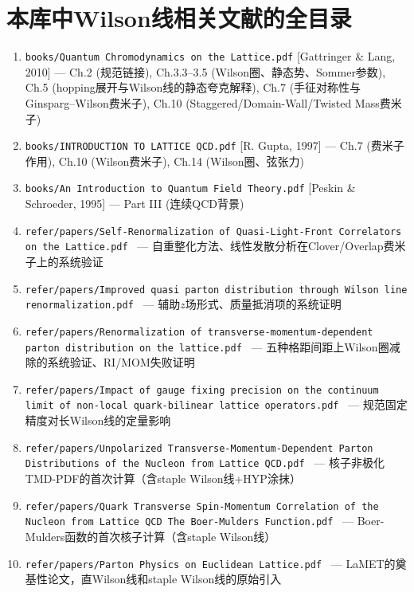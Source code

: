\documentclass[12pt,a4paper]{ctexart}
\theoremstyle{definition}
\begin{document}
\section*{本库中Wilson线相关文献的全目录}

\small
\begin{enumerate}[leftmargin=*,nosep]
    \item \texttt{books/Quantum Chromodynamics on the Lattice.pdf} [Gattringer \& Lang, 2010] — Ch.2 (规范链接), Ch.3.3--3.5 (Wilson圈、静态势、Sommer参数), Ch.5 (hopping展开与Wilson线的静态夸克解释), Ch.7 (手征对称性与Ginsparg--Wilson费米子), Ch.10 (Staggered/Domain-Wall/Twisted Mass费米子)
    \item \texttt{books/INTRODUCTION TO LATTICE QCD.pdf} [R. Gupta, 1997] — Ch.7 (费米子作用), Ch.10 (Wilson费米子), Ch.14 (Wilson圈、弦张力)
    \item \texttt{books/An Introduction to Quantum Field Theory.pdf} [Peskin \& Schroeder, 1995] — Part III (连续QCD背景)
    \item \texttt{refer/papers/Self-Renormalization of Quasi-Light-Front Correlators on the Lattice.pdf}~\cite{Huo2021self} — 自重整化方法、线性发散分析在Clover/Overlap费米子上的系统验证
    \item \texttt{refer/papers/Improved quasi parton distribution through Wilson line renormalization.pdf}~\cite{Chen2018WLrenorm} — 辅助$z$场形式、质量抵消项的系统证明
    \item \texttt{refer/papers/Renormalization of transverse-momentum-dependent parton distribution on the lattice.pdf}~\cite{Zhang2022renormTMD} — 五种格距间距上Wilson圈减除的系统验证、RI/MOM失败证明
    \item \texttt{refer/papers/Impact of gauge fixing precision on the continuum limit of non-local quark-bilinear lattice operators.pdf}~\cite{Zhang2024gauge_fixing} — 规范固定精度对长Wilson线的定量影响
    \item \texttt{refer/papers/Unpolarized Transverse-Momentum-Dependent Parton Distributions of the Nucleon from Lattice QCD.pdf}~\cite{He2024unpolTMD} — 核子非极化TMD-PDF的首次计算（含staple Wilson线+HYP涂抹）
    \item \texttt{refer/papers/Quark Transverse Spin-Momentum Correlation of the Nucleon from Lattice QCD The Boer-Mulders Function.pdf}~\cite{Ma2025BoerMulders} — Boer-Mulders函数的首次核子计算（含staple Wilson线）
    \item \texttt{refer/papers/Parton Physics on Euclidean Lattice.pdf}~\cite{Ji2013Euclidean} — LaMET的奠基性论文，直Wilson线和staple Wilson线的原始引入

\end{enumerate}
\end{document}

